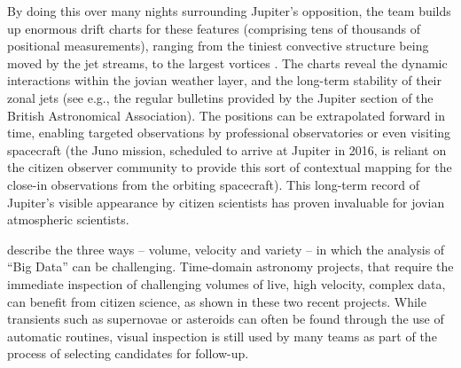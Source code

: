 \documentclass{ar2e}
\begin{document}
By doing this over many nights surrounding Jupiter's opposition, the team
builds up enormous drift charts for these features (comprising tens of
thousands of positional measurements), ranging from the tiniest convective
structure being moved by the jet streams, to the largest vortices
\citep[e.g.][]{WinJUPOSRedSpot}.  The charts reveal the dynamic interactions
within the jovian weather layer, and the long-term stability of their zonal
jets (see e.g., the regular bulletins provided by the Jupiter section of the
British Astronomical Association). The positions can be extrapolated forward
in time, enabling targeted observations by professional observatories or even
visiting spacecraft (the Juno mission, scheduled to arrive at Jupiter in 2016,
is reliant on the citizen observer community to provide this sort of
contextual mapping for the close-in observations from the orbiting
spacecraft).  This long-term record of Jupiter's visible appearance by citizen
scientists has proven invaluable for jovian atmospheric scientists.


  \label{SNZoo} 
\citet{threeVs} describe the three ways -- volume, velocity and variety -- in
which the analysis of ``Big Data'' can be challenging. Time-domain astronomy
projects, that require the immediate inspection of challenging volumes of live,
high velocity, complex data, can benefit from citizen science, as shown in these
two recent projects.  While transients such as supernovae or asteroids can often
be found through the use of automatic routines, visual inspection is still used
by many teams as part of the process of selecting candidates for follow-up. 

\end{document}
